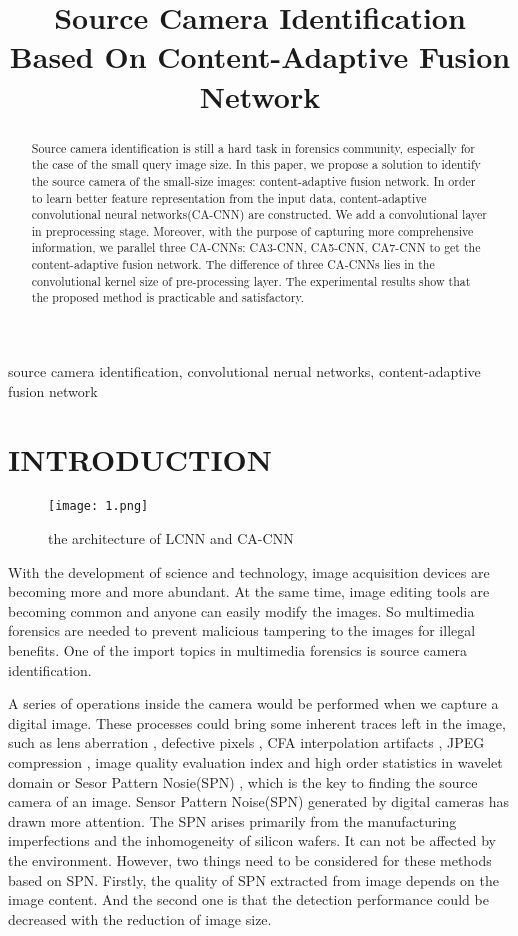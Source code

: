 \documentclass{article}
\title{Source Camera Identification Based On Content-Adaptive Fusion Network}
\begin{document}
%
\maketitle
%
\begin{abstract}
Source camera identification is still a hard task in forensics community, especially for the case of the small query image size. In this paper, we propose a solution to identify the source camera of the small-size images: content-adaptive fusion network. In order to learn better feature representation from the input data, content-adaptive convolutional neural networks(CA-CNN) are constructed. We add a convolutional layer in preprocessing stage. Moreover, with the purpose of capturing more comprehensive information, we parallel three CA-CNNs: CA3-CNN, CA5-CNN, CA7-CNN to get the content-adaptive fusion network. The difference of three CA-CNNs lies in the convolutional kernel size of pre-processing layer. The experimental results show that the proposed method is practicable and satisfactory.
\end{abstract}
%
\begin{keywords}
source camera identification, convolutional nerual networks, content-adaptive fusion network
\end{keywords}
%
\section{INTRODUCTION}
\label{sec:intro}
\begin{figure*}[!tp]
	\centering
	\texttt{[image: 1.png]}
	\caption{the architecture of LCNN and CA-CNN}
\end{figure*}

With the development of science and technology, image acquisition devices are becoming more and more abundant. At the same time, image editing tools are becoming common and anyone can easily modify the images. So multimedia forensics are needed to prevent malicious tampering to the images for illegal benefits. One of the import topics in multimedia forensics is source camera identification.  

A series of operations inside the camera would be performed when we capture a digital image. These processes could bring some inherent traces left in the image, such as lens aberration \cite{1,2}, defective pixels \cite{3,4}, CFA interpolation artifacts \cite{5}, JPEG compression \cite{6,7}, image quality evaluation index and high order statistics in wavelet domain \cite{8,9} or Sesor Pattern Nosie(SPN) \cite{10,11,12,13,14,15}, which is the key to finding the source camera of an image. Sensor Pattern Noise(SPN) generated by digital cameras has drawn more attention. The SPN arises primarily from the manufacturing imperfections and the inhomogeneity of silicon wafers. It can not be affected by the environment. However, two things need to be considered for these methods based on SPN. Firstly, the quality of SPN extracted from image depends on the image content. And the second one is that the detection performance could be decreased with the reduction of image size. 
\end{document}
